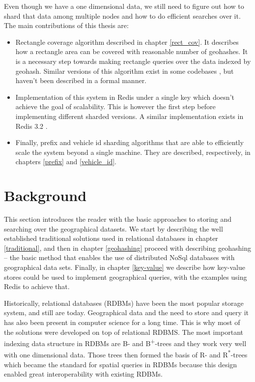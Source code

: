 \documentclass[times, utf8, diplomski]{fer}
\newcommand{\bplus}{B\textsuperscript{+}}
\newcommand{\rstar}{R\textsuperscript{*}}
\begin{document}
Even though we have a one dimensional data, we still need to figure out how to shard that data among multiple nodes and how to do efficient searches over it. The main contributions of this thesis are:
\begin{itemize}
\item Rectangle coverage algorithm described in chapter \ref{rect_cov}. It describes how a rectangle area can be covered with reasonable number of geohashes. It is a necessary step towards making rectangle queries over the data indexed by geohash. Similar versions of this algorithm exist in some codebases \citet{davidmoten}, but haven't been described in a formal manner.

\item Implementation of this system in Redis under a single key which doesn't achieve the goal of scalability. This is however the first step before implementing different sharded versions. A similar implementation exists in Redis 3.2 \cite{redis_geo}.

\item Finally, prefix and vehicle id sharding algorithms that are able to efficiently scale the system beyond a single machine. They are described, respectively, in chapters \ref{prefix} and \ref{vehicle_id}.
\end{itemize} 

\chapter{Background}
This section introduces the reader with the basic approaches to storing and searching over the geographical datasets. We start by describing the well established traditional solutions used in relational databases in chapter \ref{traditional}, and then in chapter \ref{geohashing} proceed with describing geohashing -- the basic method that enables the use of distributed NoSql databases with geographical data sets. Finally, in chapter \ref{key-value} we describe how key-value stores could be used to implement geographical queries, with the examples using Redis to achieve that.

Historically, relational databases (RDBMs) have been the most popular storage system, and still are today. Geographical data and the need to store and query it has also been present in computer science for a long time. This is why most of the solutions were developed on top of relational RDBMS. The most important indexing data structure in RDBMs are B- and \bplus-trees and they work very well with one dimensional data. Those trees then formed the basis of R- and \rstar-trees which became the standard for spatial queries in RDBMs because this design enabled great interoperability with existing RDBMs.
\end{document}
